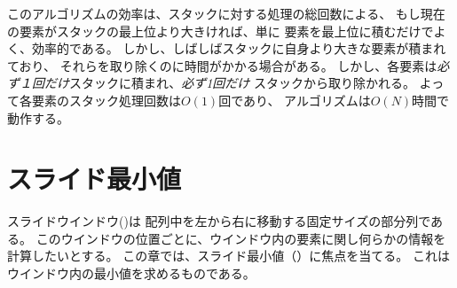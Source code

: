 このアルゴリズムの効率は、スタックに対する処理の総回数による、
もし現在の要素がスタックの最上位より大きければ、単に
要素を最上位に積むだけでよく、効率的である。
しかし、しばしばスタックに自身より大きな要素が積まれており、
それらを取り除くのに時間がかかる場合がある。
しかし、各要素は\emph{必ず１回だけ}スタックに積まれ、\emph{必ず1回だけ}
スタックから取り除かれる。
よって各要素のスタック処理回数は$O(1)$回であり、
アルゴリズムは$O(N)$時間で動作する。

\begin{comment}
\section{Sliding window minimum}

\index{sliding window}
\index{sliding window minimum}

A \key{sliding window} is a constant-size subarray
that moves from left to right through the array.
At each window position,
we want to calculate some information
about the elements inside the window.
In this section, we focus on the problem
of maintaining the \key{sliding window minimum},
which means that
we should report the smallest value inside each window.
\end{comment}

\section{スライド最小値}


スライドウインドウ()は
配列中を左から右に移動する固定サイズの部分列である。
このウインドウの位置ごとに、ウインドウ内の要素に関し何らかの情報を計算したいとする。
この章では、スライド最小値（）に焦点を当てる。
これはウインドウ内の最小値を求めるものである。

\begin{comment}
The sliding window minimum can be calculated
using a similar idea that we used to calculate
the nearest smaller elements.
We maintain a queue
where each element is larger than
the previous element,
and the first element
always corresponds to the minimum element inside the window.
After each window move,
we remove elements from the end of the queue
until the last queue element
is smaller than the new window element,
or the queue becomes empty.
We also remove the first queue element
if it is not inside the window anymore.
Finally, we add the new window element
to the end of the queue.

As an example, consider the following array:
\end{comment}

